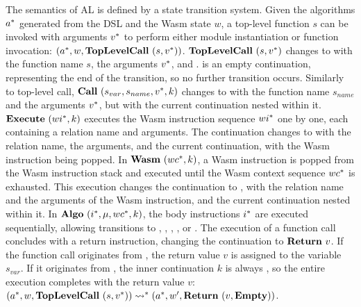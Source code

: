 The semantics of AL is defined by a state transition system.
Given the algorithms $a^*$ generated from the DSL and the Wasm state $w$, a
top-level function $s$ can be invoked with arguments $v^*$ to perform
either module instantiation or function invocation:
$(a^*, w, \textbf{TopLevelCall} ~ (s, v^*))$.
$\textbf{TopLevelCall} ~ (s, v^*)${} changes to \algo{} with the function name $s$, the arguments
$v^*$, and \mt{}.
\mt{} is an empty continuation, representing the end of the transition, so no
further transition occurs.
Similarly to top-level call, $\textbf{Call}~ (s_{var}, s_{name}, v^*, k)${} changes
to \algo{} with the function name $s_{name}$ and the arguments $v^*$, but
with the current continuation nested within it.
$\textbf{Execute} ~ (wi^*, k)${} executes the Wasm instruction sequence $wi^*$ one
by one, each containing a relation name and arguments.
The continuation changes to \algo{} with the relation name, the arguments, and
the current continuation, with the Wasm instruction being popped.
In $\textbf{Wasm} ~ (wc^*, k)${}, a Wasm instruction is popped from
the Wasm instruction stack and executed until the Wasm context sequence
$wc^*$ is exhausted.
This execution changes the continuation to \algo{}, with the relation name and
the arguments of the Wasm instruction, and the current continuation nested
within it.
In $\textbf{Algo} ~ (i^*, \mu, wc^*, k)${}, the body instructions $i^*$ are
executed sequentially, allowing transitions to \call{}, \exe{}, \wasm{},
\ret{}, or \algo{}.
The execution of a function call concludes with a return instruction, changing
the continuation to $\textbf{Return} ~ v${}.
If the function call originates from \call{}, the return value $v$ is assigned
to the variable $s_{var}$.
If it originates from \toplevelcall{}, the inner continuation $k$ is always
\mt, so the entire execution completes with the return value $v$:
$
(a^*, w, \textbf{TopLevelCall} ~ (s, v^*))
\leadsto^*
(a^*, w', \textbf{Return} ~ (v, \textbf{Empty}))
$.





